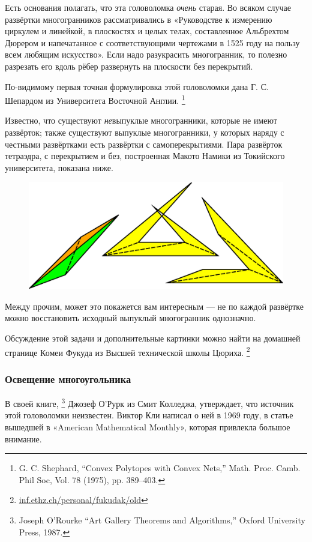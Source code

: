 Есть основания полагать, что эта головоломка \emph{очень} старая. 
Во всяком случае развёртки многогранников рассматривались в «Руководстве к измерению циркулем и линейкой, в плоскостях и целых телах, составленное Альбрехтом Дюрером и напечатанное с соответствующими чертежами в 1525 году на пользу всем любящим искусство».
Если надо разукрасить многогранник, то полезно разрезать его вдоль рёбер развернуть на плоскости без перекрытий.

По-видимому первая точная формулировка этой головоломки дана Г. С. Шепардом из Университета Восточной Англии.%
\footnote{G. C. Shephard, ``Convex Polytopes with Convex Nets,'' Math. Proc. Camb. Phil Soc, Vol. 78 (1975), pp. 389--403.}
 
Известно, что существуют \emph{не}выпуклые многогранники, которые не имеют развёрток;
также существуют выпуклые многогранники, у которых наряду с честными развёртками есть развёртки с самоперекрытиями. 
Пара развёрток тетраэдра, с перекрытием и без, построенная Макото Намики из Токийского университета, показана ниже.

\begin{figure}[h!]
\centering
\includegraphics[scale=0.5]{Figs/UnsolvedPuzzles/unfold}
\end{figure}

Между прочим, может это покажется вам интересным --- не по каждой развёртке можно восстановить исходный выпуклый многогранник однозначно. %

Обсуждение этой задачи и дополнительные картинки можно найти на домашней странице Комеи Фукуда из Высшей технической школы Цюриха.%
\footnote{\href{https://inf.ethz.ch/personal/fukudak/old/}{inf.ethz.ch/personal/fukudak/old}}

\subsubsection*{Освещение многоугольника}

В своей книге,%
\footnote{Joseph O'Rourke ``Art Gallery Theorems and Algorithms,'' Oxford University Press, 1987.}
Джозеф О’Рурк %
из Смит Колледжа, утверждает, что источник этой головоломки неизвестен.
Виктор Кли написал о ней в 1969 году, в статье вышедшей в «American Mathematical Monthly», которая привлекла большое внимание. %

